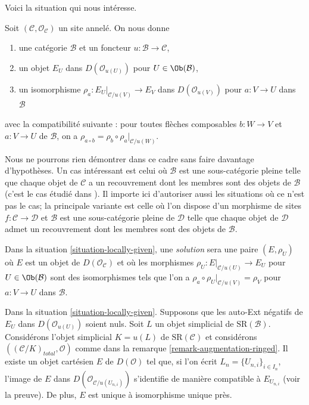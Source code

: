 \medskip\noindent
Voici la situation qui nous intéresse.

\begin{situation}
\label{situation-locally-given}
Soit $(\mathcal{C}, \mathcal{O}_\mathcal{C})$ un site annelé. On nous donne
\begin{enumerate}
\item une catégorie $\mathcal{B}$ et un foncteur
$u : \mathcal{B} \to \mathcal{C}$,
\item un objet $E_U$ dans $D(\mathcal{O}_{u(U)})$ pour $U \in \Ob(\mathcal{B})$,
\item un isomorphisme $\rho_a : E_U|_{\mathcal{C}/u(V)} \to E_V$ dans
$D(\mathcal{O}_{u(V)})$ pour $a : V \to U$ dans $\mathcal{B}$
\end{enumerate}
avec la compatibilité suivante : pour toutes flèches composables
$b : W \to V$ et $a : V \to U$ de $\mathcal{B}$, on a
$\rho_{a \circ b} = \rho_b \circ \rho_a|_{\mathcal{C}/u(W)}$.
\end{situation}

\noindent
Nous ne pourrons rien démontrer dans ce cadre sans faire davantage
d'hypothèses. Un cas intéressant est celui où $\mathcal{B}$ est une sous-catégorie pleine
telle que chaque objet de $\mathcal{C}$ a un recouvrement
dont les membres sont des objets de $\mathcal{B}$ (c'est le cas étudié
dans \cite{BBD}). Il importe ici d'autoriser aussi les situations où
ce n'est pas le cas; la principale variante est celle où l'on dispose d'un morphisme
de sites $f : \mathcal{C} \to \mathcal{D}$ et $\mathcal{B}$
est une sous-catégorie pleine de $\mathcal{D}$ telle que chaque objet de
$\mathcal{D}$ admet un recouvrement dont les membres sont des objets de $\mathcal{B}$.

\medskip\noindent
Dans la situation \ref{situation-locally-given}, une {\it solution}
sera une paire $(E, \rho_U)$ où $E$ est un objet de
$D(\mathcal{O}_\mathcal{C})$
et où les morphismes $\rho_U : E|_{\mathcal{C}/u(U)} \to E_U$
pour $U \in \Ob(\mathcal{B})$
sont des isomorphismes tels que
l'on a $\rho_a \circ \rho_U|_{\mathcal{C}/u(V)} = \rho_V$
pour $a : V \to U$ dans $\mathcal{B}$.

\begin{lemma}
\label{lemma-prepare-bbd-glueing}
Dans la situation \ref{situation-locally-given}.
Supposons que les auto-Ext négatifs de $E_U$ dans $D(\mathcal{O}_{u(U)})$ soient nuls.
Soit $L$ un objet simplicial de $\text{SR}(\mathcal{B})$.
Considérons l'objet simplicial $K = u(L)$ de $\text{SR}(\mathcal{C})$
et considérons $((\mathcal{C}/K)_{total}, \mathcal{O})$ comme dans la
remarque \ref{remark-augmentation-ringed}.
Il existe un objet cartésien $E$ de $D(\mathcal{O})$
tel que, si l'on écrit $L_n = \{U_{n, i}\}_{i \in I_n}$,
l'image de $E$ dans $D(\mathcal{O}_{\mathcal{C}/u(U_{n, i})})$
s'identifie de manière compatible à $E_{U_{n, i}}$ (voir la preuve).
De plus, $E$ est unique à isomorphisme unique près.
\end{lemma}

